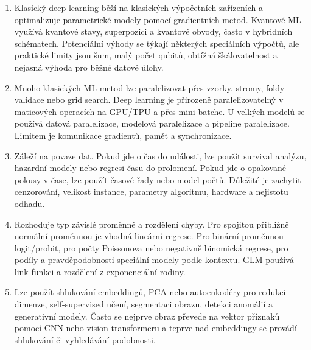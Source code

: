 \documentclass[12pt,a4paper]{article}
\begin{document}
\begin{enumerate}
  \item {}

  Klasický deep learning běží na klasických výpočetních zařízeních a optimalizuje parametrické modely
  pomocí gradientních metod. Kvantové ML využívá kvantové stavy, superpozici a kvantové obvody, často
  v hybridních schématech. Potenciální výhody se týkají některých speciálních výpočtů, ale praktické
  limity jsou šum, malý počet qubitů, obtížná škálovatelnost a nejasná výhoda pro běžné datové úlohy.

  \item {}

  Mnoho klasických ML metod lze paralelizovat přes vzorky, stromy, foldy validace nebo grid search.
  Deep learning je přirozeně paralelizovatelný v maticových operacích na GPU/TPU a přes mini-batche.
  U velkých modelů se používá datová paralelizace, modelová paralelizace a pipeline paralelizace.
  Limitem je komunikace gradientů, paměť a synchronizace.

  \item {}

  Záleží na povaze dat. Pokud jde o čas do události, lze použít survival analýzu, hazardní modely nebo
  regresi času do prolomení. Pokud jde o opakované pokusy v čase, lze použít časové řady nebo model
  počtů. Důležité je zachytit cenzorování, velikost instance, parametry algoritmu, hardware a nejistotu
  odhadu.

  \item {}

  Rozhoduje typ závislé proměnné a rozdělení chyby. Pro spojitou přibližně normální proměnnou je
  vhodná lineární regrese. Pro binární proměnnou logit/probit, pro počty Poissonova nebo negativně
  binomická regrese, pro podíly a pravděpodobnosti speciální modely podle kontextu. GLM používá link
  funkci a rozdělení z exponenciální rodiny.

  \item {}

  Lze použít shlukování embeddingů, PCA nebo autoenkodéry pro redukci dimenze, self-supervised učení,
  segmentaci obrazu, detekci anomálií a generativní modely. Často se nejprve obraz převede na vektor
  příznaků pomocí CNN nebo vision transformeru a teprve nad embeddingy se provádí shlukování či
  vyhledávání podobnosti.


\end{enumerate}
\end{document}
